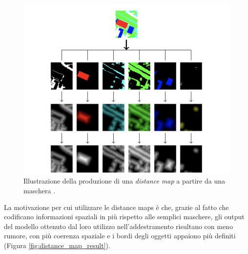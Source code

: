 \begin{figure}[h!]
    \centering
    \hspace*{-0.2in}
    \includegraphics[scale=0.56]{img/distance_mps.png}
    \caption{Illustrazione della produzione di una \textit{distance map} a partire da una maschera \cite{distance_map}.}
    \label{fig:distance_maps}
\end{figure}

La motivazione per cui utilizzare le distance maps è che, grazie al fatto che codificano informazioni spaziali in più rispetto alle semplici maschere, gli output del modello ottenuto dal loro utilizzo nell'addestramento risultano con meno rumore, con più coerenza spaziale e i bordi degli oggetti appaiono più definiti (Figura \ref{fig:distance_map_result}).

